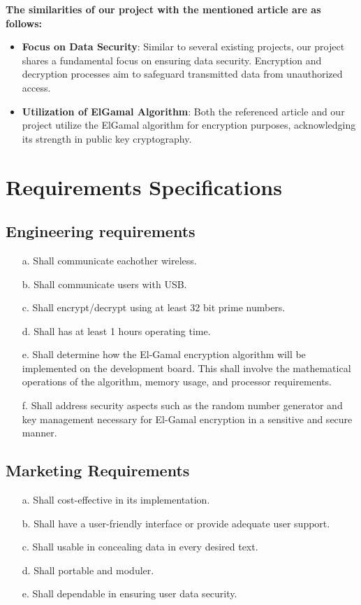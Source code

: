 \documentclass[12pt]{article}
\begin{document}
	 \textbf{The similarities of our project with the mentioned article are as follows:}
	 \begin{itemize}
	 	\item \textbf{Focus on Data Security}: Similar to several existing projects, our project shares a fundamental focus on ensuring data security. Encryption and decryption processes aim to safeguard transmitted data from unauthorized access.
	 	
	 	\item \textbf{Utilization of ElGamal Algorithm}: Both the referenced article and our project utilize the ElGamal algorithm for encryption purposes, acknowledging its strength in public key cryptography.
	 \end{itemize}
		

		
	
	
	\section{Requirements Specifications}
		
	\subsection{Engineering requirements}
	\begin{enumerate}
		\item[a.] Shall communicate eachother wireless.
		\item[b.] Shall communicate users with USB.
		\item[c.] Shall encrypt/decrypt using at least 32 bit prime numbers.
		\item[d.] Shall has at least 1 hours operating time.
		\item[e.] Shall determine how the El-Gamal encryption algorithm will be implemented on the development board. This shall involve the mathematical operations of the algorithm, memory usage, and processor requirements. 
		\item[f.] Shall address security aspects such as the random number generator and key management necessary for El-Gamal encryption in a sensitive and secure manner.
		
	
				
	\end{enumerate}
	\subsection{Marketing Requirements}
	\begin{enumerate}
		\item[a.] Shall  cost-effective in its implementation.
		\item[b.] Shall have a user-friendly interface or provide adequate user support.
		\item[c.] Shall  usable in concealing data in every desired text.
		\item[d.] Shall  portable and moduler.
		\item[e.] Shall  dependable in ensuring user data security.				
	\end{enumerate}
\end{document}
